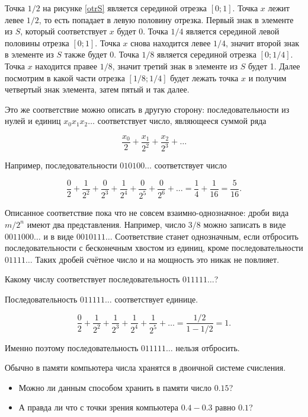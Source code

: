 \documentclass[12pt, a4paper]{article}
\begin{document}
\begin{itemize}
Точка $1/2$ на рисунке \ref{otrS} является серединой отрезка $[0; 1]$. Точка $x$ лежит левее $1/2$, то есть попадает в левую половину отрезка. Первый знак в элементе из $S$, который соответствует $x$ будет 0. Точка $1/4$ является серединой левой  половины отрезка $[0;1]$. Точка $x$ снова находится левее $1/4$, значит второй знак в элементе из $S$ также будет 0. Точка $1/8$ является серединой отрезка $[0; 1/4]$. Точка $x$ находится правее $1/8$, значит третий знак в элементе из $S$ будет 1. Далее посмотрим в какой части отрезка $[1/8; 1/4]$ будет лежать точка $x$ и получим четвертый знак элемента, затем пятый и так далее.

Это же соответствие можно описать в другую сторону: последовательности из нулей и единиц $x_0 x_1 x_2 \dots$ соответствует число, являющееся суммой ряда

\[ \frac{x_0}{2}+\frac{x_1}{2^2}+\frac{x_2}{2^3}+\dots \]

Например, последовательности $010100 \dots$ соответствует число

\[\frac{0}{2}+\frac{1}{2^2}+\frac{0}{2^3}+\frac{1}{2^4}+\frac{0}{2^5}+\frac{0}{2^6}+ \dots =  \frac{1}{4}+\frac{1}{16}= \frac{5}{16}.\]

Описанное соответствие пока что не совсем взаимно-однозначное: дроби вида $m/2^n$ имеют два представления. Например, число $3/8$ можно записать в виде $0011000 \dots$ и в виде $0010111 \dots$ Соответствие станет однозначным, если отбросить последовательности с бесконечным хвостом из единиц, кроме последовательности $01111 \dots$ Таких дробей счётное число и на мощность это никак не повлияет.

\begin{blits}
Какому числу соответствует последовательность $011111 \dots$?
\end{blits}

Последовательность $011111 \dots$ соответствует единице.

\[\frac{0}{2} + \frac{1}{2^2} + \frac{1}{2^3} + \frac{1}{2^4} + \frac{1}{2^5} + \ldots = \frac{1/2}{1-1/2} = 1.\]

Именно поэтому последовательность $011111 \dots$ нельзя отбросить.

\begin{blits}
Обычно в памяти компьютера числа хранятся в двоичной системе счисления.

\begin{itemize}
\item Можно ли данным способом хранить в памяти число $0.15$?
\item А правда ли что с точки зрения компьютера $0.4 - 0.3$ равно $0.1$?
\end{itemize}
\end{blits}


\end{itemize}
\end{document}
